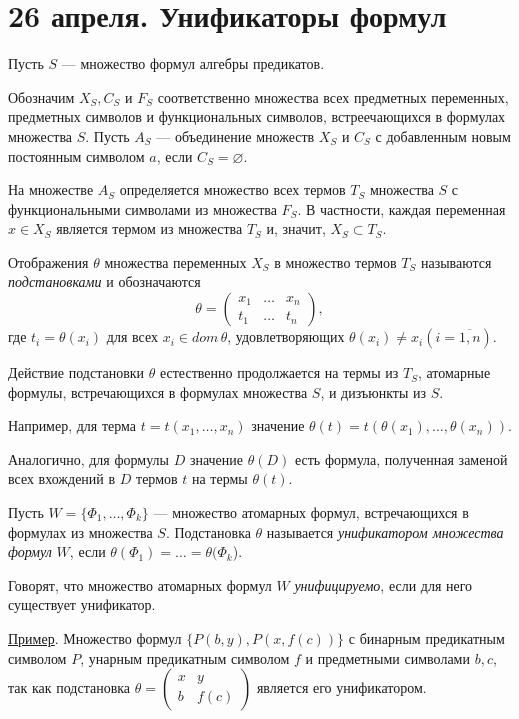 \chapter{26 апреля. Унификаторы формул}
Пусть $S$ --- множество формул алгебры предикатов.

Обозначим $X_S, C_S$ и $F_S$ соответственно множества всех предметных переменных, предметных символов и функциональных символов, встреечающихся в формулах множества $S$. Пусть $A_S$ --- объединение множеств $X_S$ и $C_S$ с добавленным новым постоянным символом $a$, если $C_S = \varnothing$.

На множестве $A_S$ определяется множество всех термов $T_S$ множества $S$ с функциональными символами из множества $F_S$. В частности, каждая переменная $x \in X_S$ является термом из множества $T_S$ и, значит, $X_S \subset T_S$.

Отображения $\theta$ множества переменных $X_S$ в множество термов $T_S$ называются {\it подстановками} и обозначаются
\begin{equation*}
    \theta = \left(\begin{matrix}
        x_1 & \dots & x_n \\ t_1 & \dots & t_n
    \end{matrix}\right),
\end{equation*}
где $t_i = \theta(x_i)$ для всех $x_i \in dom\, \theta$, удовлетворяющих $\theta(x_i) \neq x_i (i = \overline{1,n})$.

Действие подстановки $\theta$ естественно продолжается на термы из $T_S$, атомарные формулы, встречающихся в формулах множества $S$, и дизъюнкты из $S$.

Например, для терма $t=t(x_1,\dots,x_n)$ значение $\theta(t) = t(\theta(x_1), \dots, \theta(x_n))$.

Аналогично, для формулы $D$ значение $\theta(D)$ есть формула, полученная заменой всех вхождений в $D$ термов $t$ на термы $\theta(t)$.

Пусть $W=\{\Phi_1,\dots,\Phi_k\}$ --- множество атомарных формул, встречающихся в формулах из множества $S$. Подстановка $\theta$ называется \textit{унификатором множества формул} $W$, если $\theta(\Phi_1) = \dots = \theta(\Phi_k$).

Говорят, что множество атомарных формул $W$ \textit{унифицируемо}, если для него существует унификатор.

\underline{Пример}. Множество формул $\{P(b, y), P(x, f(c))\}$ с бинарным предикатным символом $P$, унарным предикатным символом $f$ и предметными символами $b, c$, так как подстановка $\theta = \left(
    \begin{matrix}
        x & y \\
        b & f(c)
    \end{matrix}
\right)$ является его унификатором.


